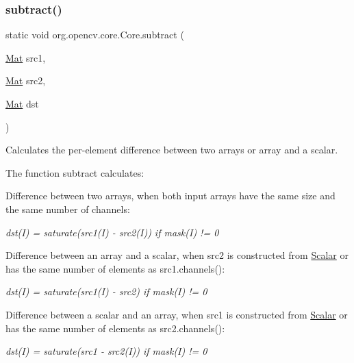 \subsubsection{\texorpdfstring{subtract()}{subtract()}\hspace{0.1cm}{\footnotesize\ttfamily [3/6]}}
{\footnotesize\ttfamily static void org.\+opencv.\+core.\+Core.\+subtract (\begin{DoxyParamCaption}\item[{\mbox{\hyperlink{classorg_1_1opencv_1_1core_1_1_mat}{Mat}}}]{src1,  }\item[{\mbox{\hyperlink{classorg_1_1opencv_1_1core_1_1_mat}{Mat}}}]{src2,  }\item[{\mbox{\hyperlink{classorg_1_1opencv_1_1core_1_1_mat}{Mat}}}]{dst }\end{DoxyParamCaption})\hspace{0.3cm}{\ttfamily [static]}}

Calculates the per-\/element difference between two arrays or array and a scalar.

The function {\ttfamily subtract} calculates\+:


\begin{DoxyItemize}
\item Difference between two arrays, when both input arrays have the same size and the same number of channels\+: 
\end{DoxyItemize}

{\itshape dst(\+I) = saturate(src1(\+I) -\/ src2(\+I)) if mask(\+I) != 0}


\begin{DoxyItemize}
\item Difference between an array and a scalar, when {\ttfamily src2} is constructed from {\ttfamily \mbox{\hyperlink{classorg_1_1opencv_1_1core_1_1_scalar}{Scalar}}} or has the same number of elements as {\ttfamily src1.\+channels()}\+: 
\end{DoxyItemize}

{\itshape dst(\+I) = saturate(src1(\+I) -\/ src2) if mask(\+I) != 0}


\begin{DoxyItemize}
\item Difference between a scalar and an array, when {\ttfamily src1} is constructed from {\ttfamily \mbox{\hyperlink{classorg_1_1opencv_1_1core_1_1_scalar}{Scalar}}} or has the same number of elements as {\ttfamily src2.\+channels()}\+: 
\end{DoxyItemize}

{\itshape dst(\+I) = saturate(src1 -\/ src2(\+I)) if mask(\+I) != 0}


